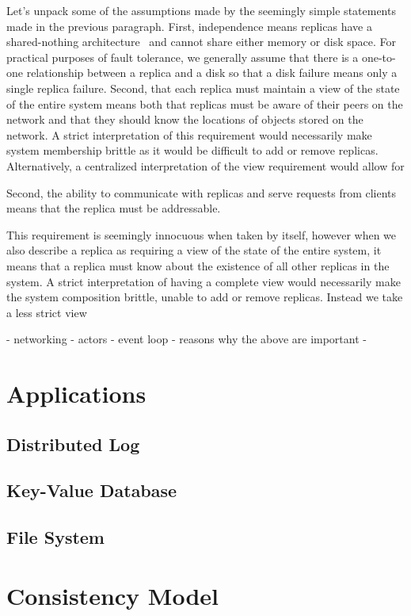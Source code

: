 Let's unpack some of the assumptions made by the seemingly simple statements made in the previous paragraph.
First, independence means replicas have a shared-nothing architecture~\cite{shared_nothing} and cannot share either memory or disk space.
For practical purposes of fault tolerance, we generally assume that there is a one-to-one relationship between a replica and a disk so that a disk failure means only a single replica failure.
Second, that each replica must maintain a view of the state of the entire system means both that replicas must be aware of their peers on the network and that they should know the locations of objects stored on the network.
A strict interpretation of this requirement would necessarily make system membership brittle as it would be difficult to add or remove replicas.
Alternatively, a centralized interpretation of the view requirement would allow for


Second, the ability to communicate with replicas and serve requests from clients means that the replica must be addressable.


This requirement is seemingly innocuous when taken by itself, however when we also describe a replica as requiring a view of the state of the entire system, it means that a replica must know about the existence of all other replicas in the system.
A strict interpretation of having a complete view would necessarily make the system composition brittle, unable to add or remove replicas.
Instead we take a less strict view


- networking
- actors
- event loop
- reasons why the above are important
-

\section{Applications}

\subsection{Distributed Log}

\subsection{Key-Value Database}

\subsection{File System}

\section{Consistency Model}

